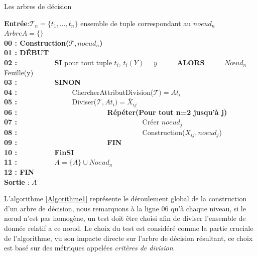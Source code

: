 \documentclass[a4paper, 11pt]{report}
\newcommand{\set}[1]{\ensuremath{\overline{#1}}}
\newcommand{\tupleset}{\ensuremath{\mathcal{T}}}
\begin{document}
\begin{chapter}{Les arbres de décision}
\newpage
\begin{algorithm}[!h]
\renewcommand\thealgorithm{}
\caption{\textbf{1 } : Algorithme de création d'un arbre de décision}
\begin{algorithmic}
\STATE \textbf{Entrée}:$\tupleset_n=\{t_1,\dots,t_n\}$ ensemble de tuple correspondant au $noeud_n$\\
\textbf{$Arbre A=\{\}$}\\
\textbf{00 : Construction($\tupleset,noeud_n$)}\\
\textbf{01 : DÉBUT}\\
\textbf{02 : }\ \ \ \ \ \ \ \ \ \ \textbf{SI} pour tout tuple $t_i$, $t_i(Y) = y$  \ \ \ \ \  	\textbf{ALORS} \ \ \ \ \ $Nœud_n$ = Feuille(y)\\
\textbf{03 : }\ \ \ \ \ \ \ \ \ \ \textbf{SINON}\\
\textbf{04 : }\ \ \ \ \ \ \ \ \ \ \ \ \ \ \ ChercherAttributDivision($\tupleset)=At_i$\\
\textbf{05 : }\ \ \ \ \ \ \ \ \ \ \ \ \ \ \ Diviser($\tupleset,At_i)=\set X_{ij}$\\
\textbf{06 : }\ \ \ \ \ \ \ \ \ \ \ \ \ \ \ \ \ \ \ \ \ \ \ \ \ \textbf{Répéter(Pour tout n=2 jusqu'à j)}\\
\textbf{07 : }\ \ \ \ \ \ \ \ \ \ \ \ \ \ \ \ \ \ \ \ \ \ \ \ \ \ \ \ \ \ \ \ \ \ \ Créer $noeud_j$\\
\textbf{08 : }\ \ \ \ \ \ \ \ \ \ \ \ \ \ \ \ \ \ \ \ \ \ \ \ \ \ \ \ \ \ \ \ \ \ \ Construction($X_{ij},noeud_j$)\\
\textbf{09 : }\ \ \ \ \ \ \ \ \ \ \ \ \ \ \ \ \ \ \ \ \ \ \ \ \ \textbf{FIN}\\

\textbf{10 : }\ \ \ \ \ \ \ \ \ \ \textbf{FinSI}\\
\textbf{11 : }\ \ \ \ \ \ \ \ \ \ \textbf{$A=\{ A \} \cup Noeud_n$}\\
\textbf{12 : FIN}\\
\textbf{Sortie} : $A$

\label{Algorithme1}
\end{algorithmic}
\addtocounter{algorithm}{-1}
\end{algorithm}


L'algorithme \ref{Algorithme1} représente le déroulement global de la construction d'un arbre de décision, nous remarquons à la ligne 06 qu'à chaque niveau, si le nœud n'est pas homogène, un test doit être choisi afin de diviser l'ensemble de donnée relatif a ce nœud. Le choix du test est considéré comme la partie cruciale de l'algorithme, vu son impacte directe sur l'arbre de décision résultant, ce choix est basé sur des métriques appelées \emph{critères de division}.\\ 


\end{chapter}
\end{document}
